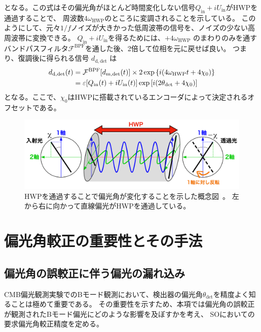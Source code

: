 \documentclass[../../main.tex]{subfiles}
\begin{document}
となる。この式はその偏光角がほとんど時間変化しない信号$Q_{\mathrm{in}}+iU_{\mathrm{in}}$がHWPを通過することで、
周波数$4\omega_{\mathrm{HWP}}$のところに変調されることを示している。
このようにして、元々$1/f$ノイズが大きかった低周波帯の信号を、ノイズの少ない高周波帯に変換できる。
$Q_{\mathrm{in}}+iU_{\mathrm{in}}$を得るためには、$+4\omega_{\mathrm{HWP}}$ のまわりのみを通すバンドパスフィルタ$\mathcal{F}^{\mathrm{BPF}}$を通した後、2倍して位相を元に戻せば良い。
つまり、復調後に得られる信号 $d_{\mathrm{d, det}}$ は
\begin{align}
    d_{\mathrm{d, det}}(t) &= \mathcal{F}^{\mathrm{BPF}}\qty[d_{\mathrm{m,det}}(t)]\times 2\exp\qty{i\qty(4\omega_{\mathrm{HWP}}t + 4\chi_0)} \\
    &= \varepsilon\qty[Q_{\mathrm{in}}(t) + iU_{\mathrm{in}}(t)]\exp\qty[i\qty(2\theta_{\mathrm{det}}+4\chi_0)]
    \label{eq:so-hwp_demod}
\end{align}
となる。ここで、$\chi_0$はHWPに搭載されているエンコーダによって決定されるオフセットである。

\begin{figure}[H]
    \centering
    \includegraphics[width=1.0\textwidth]{simons_observatory/hwp_satoru.pdf}
    \caption{HWPを通過することで偏光角が変化することを示した概念図~\cite{takakura_PhD}。
    左から右に向かって直線偏光がHWPを通過している。}
    \label{fig:so-hwp_satoru}
\end{figure}

\section{偏光角較正の重要性とその手法}
\subsection{偏光角の誤較正に伴う偏光の漏れ込み}
CMB偏光観測実験でのBモード観測において、検出器の偏光角$\theta_{\mathrm{det}}$を精度よく知ることは極めて重要である。
その重要性を示すため、本項では偏光角の誤較正が観測されたBモード偏光にどのような影響を及ぼすかを考え、
SOにおいての要求偏光角較正精度を定める。
\end{document}
